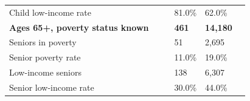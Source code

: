 \documentclass[9pt]{report}
\begin{document}
\begin{tabular}{p{.10in}p{.10in}p{.10in}p{3.7in}>{\hfill}p{.85in}>{\hfill}p{.85in}>{\hfill}p{.85in}>{\hfill}p{.85in}p{0.1in}}
\multicolumn{4}{l}{\parbox{3.6in}{\strut\raggedright{{Child low-income rate}}\strut}} &  &  & 81.0\% & 62.0\% & \multicolumn{1}{l}{}  \\ 
\multicolumn{4}{l}{\parbox{3.5in}{\strut\raggedright{\textbf{Ages 65+, poverty status known}\strut}}} & \textbf{} & \textbf{} & \textbf{461} & \textbf{14,180} & \textbf{} \\ 
\multicolumn{4}{l}{\parbox{3.6in}{\strut\raggedright{{Seniors in poverty}}\strut}} &  &  & 51 & 2,695 & \multicolumn{1}{l}{}  \\ 
\multicolumn{4}{l}{\parbox{3.6in}{\strut\raggedright{{Senior poverty rate}}\strut}} &  &  & 11.0\% & 19.0\% & \multicolumn{1}{l}{}  \\ 
\multicolumn{4}{l}{\parbox{3.6in}{\strut\raggedright{{Low-income seniors}}\strut}} &  &  & 138 & 6,307 & \multicolumn{1}{l}{}  \\ 
\multicolumn{4}{l}{\parbox{3.6in}{\strut\raggedright{{Senior low-income rate}}\strut}} &  &  & 30.0\% & 44.0\% & \multicolumn{1}{l}{}  \\ 

\end{tabular}
\setlength{\tabcolsep}{6pt} %
\end{document}
